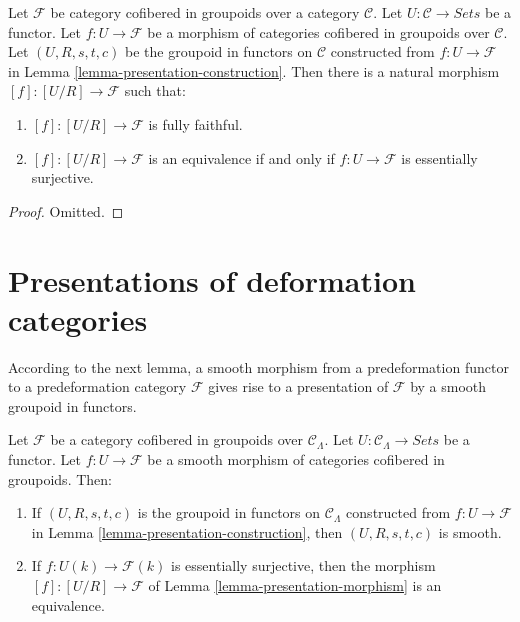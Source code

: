 \begin{lemma}
\label{lemma-presentation-morphism}
Let $\mathcal{F}$ be category cofibered in groupoids over a category
$\mathcal{C}$. Let $U : \mathcal{C} \to \textit{Sets}$ be a functor.
Let $f : U \to \mathcal{F}$ be a morphism of categories cofibered in groupoids
over $\mathcal{C}$. Let $(U, R, s, t, c)$ be the groupoid in functors on
$\mathcal{C}$ constructed from $f : U \to \mathcal{F}$ in
Lemma \ref{lemma-presentation-construction}.
Then there is a natural morphism $[f] : [U/R] \to \mathcal{F}$ such that:
\begin{enumerate}
\item $[f]: [U/R] \to \mathcal{F}$ is fully faithful.
\item $[f]: [U/R] \to \mathcal{F}$ is an equivalence if and only if
$f : U \to \mathcal{F}$ is essentially surjective.
\end{enumerate}
\end{lemma}

\begin{proof}
Omitted.
\end{proof}







\section{Presentations of deformation categories}
\label{section-presentation-deformation-categories}

\noindent
According to the next lemma, a smooth morphism from a predeformation functor to
a predeformation category $\mathcal{F}$ gives rise to a presentation of
$\mathcal{F}$ by a smooth groupoid in functors.

\begin{lemma}
\label{lemma-smooth-groupoid-in-functors-construction}
Let $\mathcal{F}$ be a category cofibered in groupoids over
$\mathcal{C}_\Lambda$. Let $U : \mathcal{C}_\Lambda \to \textit{Sets}$
be a functor. Let $f : U \to \mathcal{F}$ be a smooth morphism of
categories cofibered in groupoids. Then:
\begin{enumerate}
\item If $(U, R, s, t, c)$ is the groupoid in functors on
$\mathcal{C}_\Lambda$ constructed from $f : U \to \mathcal{F}$ in
Lemma \ref{lemma-presentation-construction}, then $(U, R, s, t, c)$
is smooth.
\item If $f : U(k) \to \mathcal{F}(k)$ is essentially surjective,
then the morphism $[f] : [U/R] \to \mathcal{F}$ of
Lemma \ref{lemma-presentation-morphism}
is an equivalence.
\end{enumerate}
\end{lemma}


